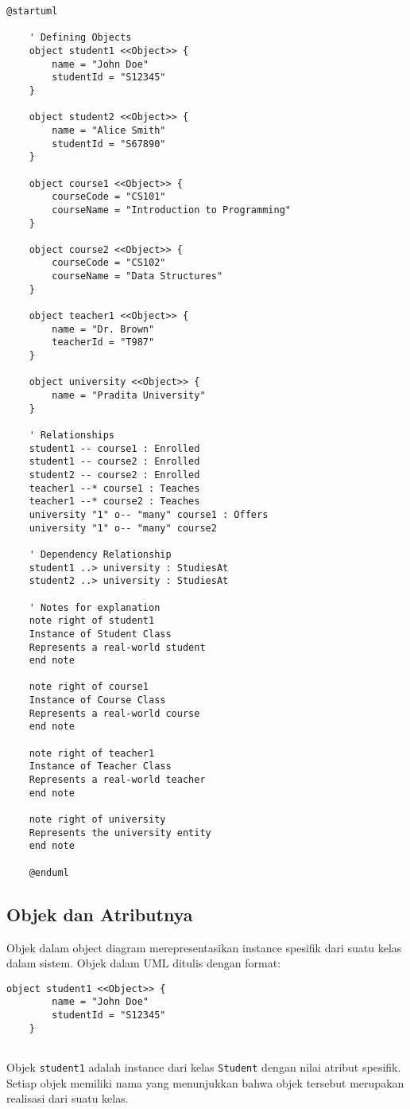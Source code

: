\begin{lstlisting}[language=puml,caption={PlantUML Object Diagram Code}]
	@startuml
	
	' Defining Objects
	object student1 <<Object>> {
		name = "John Doe"
		studentId = "S12345"
	}
	
	object student2 <<Object>> {
		name = "Alice Smith"
		studentId = "S67890"
	}
	
	object course1 <<Object>> {
		courseCode = "CS101"
		courseName = "Introduction to Programming"
	}
	
	object course2 <<Object>> {
		courseCode = "CS102"
		courseName = "Data Structures"
	}
	
	object teacher1 <<Object>> {
		name = "Dr. Brown"
		teacherId = "T987"
	}
	
	object university <<Object>> {
		name = "Pradita University"
	}
	
	' Relationships
	student1 -- course1 : Enrolled
	student1 -- course2 : Enrolled
	student2 -- course2 : Enrolled
	teacher1 --* course1 : Teaches
	teacher1 --* course2 : Teaches
	university "1" o-- "many" course1 : Offers
	university "1" o-- "many" course2
	
	' Dependency Relationship
	student1 ..> university : StudiesAt
	student2 ..> university : StudiesAt
	
	' Notes for explanation
	note right of student1
	Instance of Student Class
	Represents a real-world student
	end note
	
	note right of course1
	Instance of Course Class
	Represents a real-world course
	end note
	
	note right of teacher1
	Instance of Teacher Class
	Represents a real-world teacher
	end note
	
	note right of university
	Represents the university entity
	end note
	
	@enduml
\end{lstlisting}


\subsection{Objek dan Atributnya}
Objek dalam object diagram merepresentasikan instance spesifik dari suatu kelas dalam sistem. Objek dalam UML ditulis dengan format:
\begin{lstlisting}[language=puml]
	object student1 <<Object>> {
		name = "John Doe"
		studentId = "S12345"
	}


\end{lstlisting}
Objek \texttt{student1} adalah instance dari kelas \texttt{Student} dengan nilai atribut spesifik. Setiap objek memiliki nama yang menunjukkan bahwa objek tersebut merupakan realisasi dari suatu kelas.

